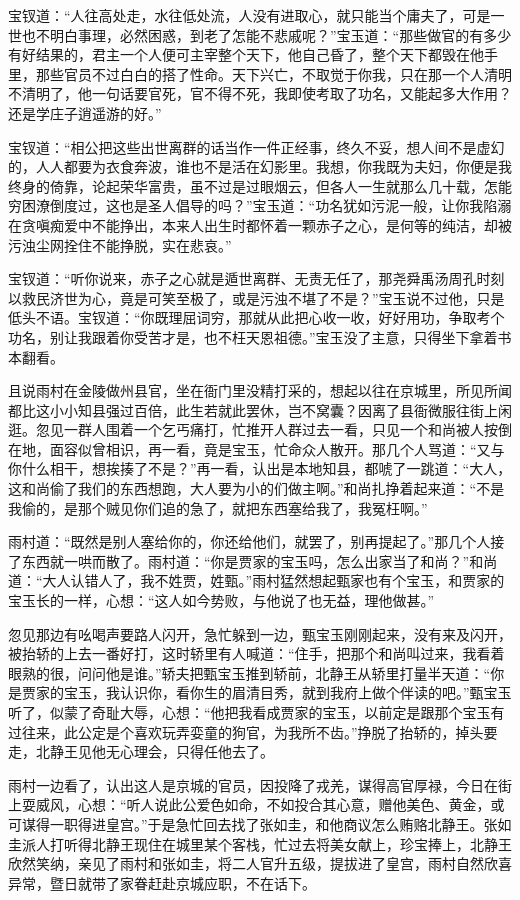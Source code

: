 \documentclass[12pt,oneside]{book}
\begin{document}
宝钗道：“人往高处走，水往低处流，人没有进取心，就只能当个庸夫了，可是一世也不明白事理，必然困惑，到老了怎能不悲戚呢？”宝玉道：“那些做官的有多少有好结果的，君主一个人便可主宰整个天下，他自己昏了，整个天下都毁在他手里，那些官员不过白白的搭了性命。天下兴亡，不取觉于你我，只在那一个人清明不清明了，他一句话要官死，官不得不死，我即使考取了功名，又能起多大作用？还是学庄子逍遥游的好。”

宝钗道：“相公把这些出世离群的话当作一件正经事，终久不妥，想人间不是虚幻的，人人都要为衣食奔波，谁也不是活在幻影里。我想，你我既为夫妇，你便是我终身的倚靠，论起荣华富贵，虽不过是过眼烟云，但各人一生就那么几十载，怎能穷困潦倒度过，这也是圣人倡导的吗？”宝玉道：“功名犹如污泥一般，让你我陷溺在贪嗔痴爱中不能挣出，本来人出生时都怀着一颗赤子之心，是何等的纯洁，却被污浊尘网拴住不能挣脱，实在悲哀。”

宝钗道：“听你说来，赤子之心就是遁世离群、无责无任了，那尧舜禹汤周孔时刻以救民济世为心，竟是可笑至极了，或是污浊不堪了不是？”宝玉说不过他，只是低头不语。宝钗道：“你既理屈词穷，那就从此把心收一收，好好用功，争取考个功名，别让我跟着你受苦才是，也不枉天恩祖德。”宝玉没了主意，只得坐下拿着书本翻看。

且说雨村在金陵做州县官，坐在衙门里没精打采的，想起以往在京城里，所见所闻都比这小小知县强过百倍，此生若就此罢休，岂不窝囊？因离了县衙微服往街上闲逛。忽见一群人围着一个乞丐痛打，忙推开人群过去一看，只见一个和尚被人按倒在地，面容似曾相识，再一看，竟是宝玉，忙命众人散开。那几个人骂道：“又与你什么相干，想挨揍了不是？”再一看，认出是本地知县，都唬了一跳道：“大人，这和尚偷了我们的东西想跑，大人要为小的们做主啊。”和尚扎挣着起来道：“不是我偷的，是那个贼见你们追的急了，就把东西塞给我了，我冤枉啊。”

雨村道：“既然是别人塞给你的，你还给他们，就罢了，别再提起了。”那几个人接了东西就一哄而散了。雨村道：“你是贾家的宝玉吗，怎么出家当了和尚？”和尚道：“大人认错人了，我不姓贾，姓甄。”雨村猛然想起甄家也有个宝玉，和贾家的宝玉长的一样，心想：“这人如今势败，与他说了也无益，理他做甚。”

忽见那边有吆喝声要路人闪开，急忙躲到一边，甄宝玉刚刚起来，没有来及闪开，被抬轿的上去一番好打，这时轿里有人喊道：“住手，把那个和尚叫过来，我看着眼熟的很，问问他是谁。”轿夫把甄宝玉推到轿前，北静王从轿里打量半天道：“你是贾家的宝玉，我认识你，看你生的眉清目秀，就到我府上做个伴读的吧。”甄宝玉听了，似蒙了奇耻大辱，心想：“他把我看成贾家的宝玉，以前定是跟那个宝玉有过往来，此公定是个喜欢玩弄娈童的狗官，为我所不齿。”挣脱了抬轿的，掉头要走，北静王见他无心理会，只得任他去了。

雨村一边看了，认出这人是京城的官员，因投降了戎羌，谋得高官厚禄，今日在街上耍威风，心想：“听人说此公爱色如命，不如投合其心意，赠他美色、黄金，或可谋得一职得进皇宫。”于是急忙回去找了张如圭，和他商议怎么贿赂北静王。张如圭派人打听得北静王现住在城里某个客栈，忙过去将美女献上，珍宝捧上，北静王欣然笑纳，亲见了雨村和张如圭，将二人官升五级，提拔进了皇宫，雨村自然欣喜异常，暨日就带了家眷赶赴京城应职，不在话下。
\end{document}
